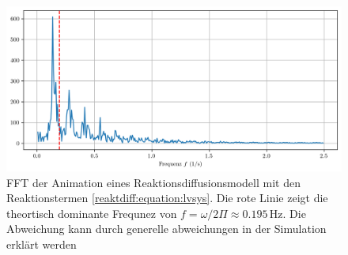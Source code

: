 \begin{figure}
    \centering
    \includegraphics[width=\linewidth]{papers/reaktdiff/images/LotkaVolterra/fft_plot_latex.png}
    \caption{FFT der Animation eines Reaktionsdiffusionsmodell mit den Reaktionstermen \eqref{reaktdiff:equation:lvsys}. Die rote Linie zeigt die theortisch dominante Frequnez von \(f = \omega / 2 \Pi \approx 0.195\,\text{Hz}\). Die Abweichung kann durch generelle abweichungen in der Simulation erklärt werden}
    \label{reaktdiff:fig:lvfft}
\end{figure}





